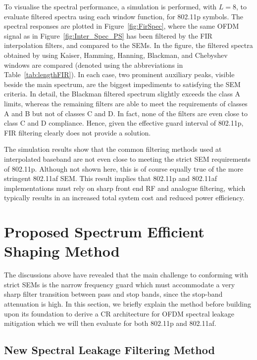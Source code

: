 To visualise the spectral performance, a simulation is performed, with $L=8$, to evaluate filtered spectra using each window function, for 802.11p symbols.
The spectral responses are plotted in Figure~\ref{fig:FirSpec}, where the same OFDM signal as in Figure~\ref{fig:Inter_Spec_PS} has been filtered by the FIR interpolation filters, and compared to the SEMs.
In the figure, the filtered spectra obtained by using Kaiser, Hamming, Hanning, Blackman, and Chebyshev windows are compared (denoted using the abbreviations in Table~\ref{tab:lengthFIR}).
In each case, two prominent auxiliary peaks, visible beside the main spectrum, are the biggest impediments to satisfying the SEM criteria.
In detail, the Blackman filtered spectrum slightly exceeds the class A limits, whereas the remaining filters are able to meet the requirements of classes A and B but not of classes C and D. In fact, none of the filters are even close to class C and D compliance.
Hence, given the effective guard interval of 802.11p, FIR filtering clearly does not provide a solution.

The simulation results show that the common filtering methods used at interpolated baseband are not even close to meeting the strict SEM requirements of 802.11p.
Although not shown here, this is of course equally true of the more stringent 802.11af SEM.
This result implies that 802.11p and 802.11af implementations must rely on sharp front end RF and analogue filtering, which typically results in an increased total system cost and reduced power efficiency.

\section{Proposed Spectrum Efficient Shaping Method}
The discussions above have revealed that the main challenge to conforming with strict SEMs is the narrow frequency guard which must accommodate a very sharp filter transition between pass and stop bands, since the stop-band attenuation is high.
In this section, we briefly explain the method before building upon its foundation to derive a CR architecture for OFDM spectral leakage mitigation which we will then evaluate for both 802.11p and 802.11af.

\subsection{New Spectral Leakage Filtering Method}

